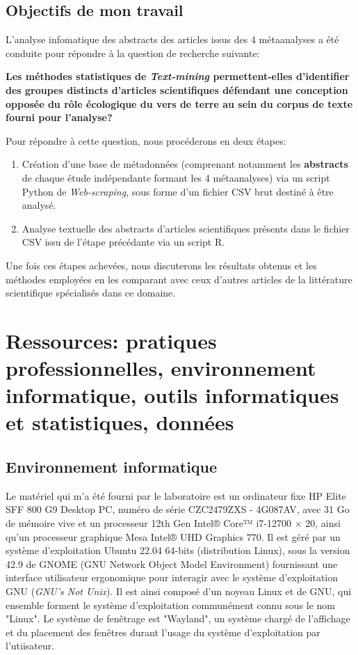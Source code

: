\documentclass{book}
\begin{document}
\section{Objectifs de mon travail}

\noindent
L'analyse infomatique des abstracts des articles issus des 4 métaanalyses a été conduite pour répondre à la question de recherche suivante:


\vspace{\baselineskip}
\noindent
\textbf{Les méthodes statistiques de \textit{Text-mining} permettent-elles d'identifier des groupes distincts d'articles scientifiques défendant une conception opposée du rôle écologique du vers de terre au sein du corpus de texte fourni pour l'analyse?}

\vspace{\baselineskip}
Pour répondre à cette question, nous procéderons en deux étapes: 
\begin{enumerate}
    \item Création d'une base de métadonnées (comprenant notamment les \textbf{abstracts} de chaque étude indépendante formant les 4 métaanalyses) via un script Python de \textit{Web-scraping}, sous forme d'un fichier CSV brut destiné à être analysé.
    \item Analyse textuelle des abstracts d'articles scientifiques présents dans le fichier CSV issu de l'étape précédante via un script R.
\end{enumerate}
\vspace{\baselineskip}
Une fois ces étapes achevées, nous discuterons les résultats obtenus et les méthodes employées en les comparant avec ceux d'autres articles de la littérature scientifique spécialisés dans ce domaine.
\thispagestyle{fancy}

\chapter[Ressources]{\label{Second Chapitre}Ressources: pratiques
  professionnelles, environnement informatique, outils informatiques et
  statistiques, données}
\section{Environnement informatique}
\noindent
Le matériel qui m'a été fourni par le laboratoire est un ordinateur fixe HP Elite SFF 800 G9 Desktop PC, numéro de série CZC2479ZXS - 4G087AV, avec 31 Go de mémoire vive et un processeur 12th Gen Intel® Core™ i7-12700 × 20, ainsi qu'un processeur graphique Mesa Intel® UHD Graphics 770. Il est géré par un système d'exploitation Ubuntu 22.04 64-bits (distribution Linux), sous la version 42.9 de GNOME (GNU Network Object Model Environment) fournissant une interface utilisateur ergonomique pour interagir avec le système d'exploitation GNU  (\textit{GNU's Not Unix}). Il est ainsi composé d'un noyeau Linux et de GNU, qui ensemble forment le système d'exploitation communément connu sous le nom "Linux". Le système de fenêtrage est "Wayland", un système chargé de l'affichage et du placement des fenêtres durant l'usage du système d'exploitation par l'utiisateur.
\end{document}
